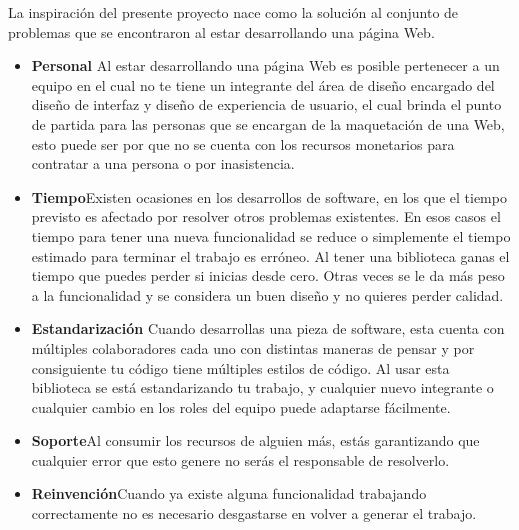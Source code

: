 La inspiración del presente proyecto nace como la solución al conjunto de problemas que se encontraron al estar desarrollando una página Web.

\begin{itemize}

   \item \textbf{Personal} \newline Al estar desarrollando una página Web es posible pertenecer a un equipo en el cual no te tiene un integrante del área de diseño encargado del diseño de interfaz y diseño de experiencia de usuario, el cual brinda el punto de partida para las personas que se encargan de la maquetación de una Web, esto puede ser por que no se cuenta con los recursos monetarios para contratar a una persona o por inasistencia.  
   \item \textbf{Tiempo}\newline  Existen ocasiones en los desarrollos de software, en los que el tiempo previsto es afectado por resolver otros problemas existentes. En esos casos el tiempo para tener una nueva funcionalidad se reduce o simplemente el tiempo estimado para terminar el trabajo es erróneo. Al tener una biblioteca ganas el tiempo que puedes perder si inicias desde cero. Otras veces se le da más peso a la funcionalidad y se considera un buen diseño y no quieres perder calidad.
   \item \textbf{Estandarización} \newline Cuando desarrollas una pieza de software, esta cuenta con múltiples colaboradores cada uno con distintas maneras de pensar y por consiguiente tu código tiene múltiples estilos de código.   Al usar esta biblioteca se está estandarizando tu trabajo, y cualquier nuevo integrante o cualquier cambio en los roles del equipo puede adaptarse fácilmente.
   \item \textbf{Soporte}\newline  Al consumir los recursos de alguien más, estás garantizando que cualquier error que esto genere no serás el responsable de resolverlo.
   \item \textbf{Reinvención}\newline  Cuando ya existe alguna funcionalidad trabajando correctamente no es necesario desgastarse en volver a generar el trabajo.
\end{itemize}